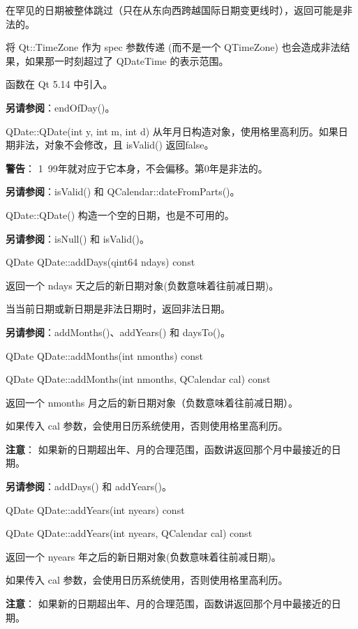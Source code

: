 在罕见的日期被整体跳过（只在从东向西跨越国际日期变更线时），返回可能是非法的。

将 Qt::TimeZone 作为 spec 参数传递 (而不是一个 QTimeZone) 也会造成非法结果，如果那一时刻超过了 QDateTime 的表示范围。

函数在 Qt 5.14 中引入。

\textbf{另请参阅}：endOfDay()。

\splitLine

QDate::QDate(int y, int m, int d)
从年月日构造对象，使用格里高利历。如果日期非法，对象不会修改，且 isValid() 返回false。

\textbf{警告}： 1~99年就对应于它本身，不会偏移。第0年是非法的。

\textbf{另请参阅}：isValid() 和 QCalendar::dateFromParts()。

\splitLine

QDate::QDate()
构造一个空的日期，也是不可用的。

\textbf{另请参阅}：isNull() 和 isValid()。

\splitLine

QDate QDate::addDays(qint64 ndays) const

返回一个 ndays 天之后的新日期对象(负数意味着往前减日期)。

当当前日期或新日期是非法日期时，返回非法日期。

\textbf{另请参阅}：addMonths()、addYears() 和 daysTo()。

\splitLine

QDate QDate::addMonths(int nmonths) const

QDate QDate::addMonths(int nmonths, QCalendar cal) const

返回一个 nmonths 月之后的新日期对象（负数意味着往前减日期）。

如果传入 cal 参数，会使用日历系统使用，否则使用格里高利历。

\textbf{注意}： 如果新的日期超出年、月的合理范围，函数讲返回那个月中最接近的日期。

\textbf{另请参阅}：addDays() 和 addYears()。

\splitLine

QDate QDate::addYears(int nyears) const

QDate QDate::addYears(int nyears, QCalendar cal) const

返回一个 nyears 年之后的新日期对象(负数意味着往前减日期)。

如果传入 cal 参数，会使用日历系统使用，否则使用格里高利历。

\textbf{注意}： 如果新的日期超出年、月的合理范围，函数讲返回那个月中最接近的日期。

